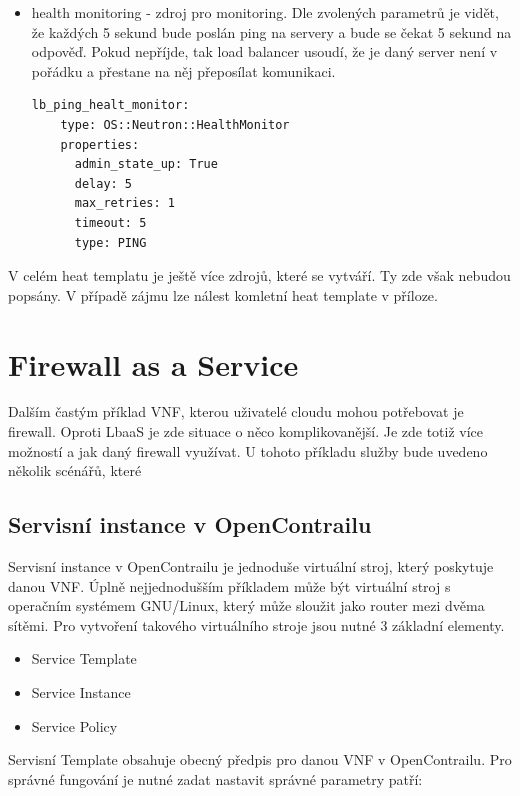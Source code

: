 \begin{itemize}
\item health monitoring - zdroj pro monitoring. Dle zvolených parametrů je vidět, že každých 5 sekund bude poslán ping na servery a bude se čekat 5 sekund na odpověď. Pokud nepříjde, tak load balancer usoudí, že je daný server není v pořádku a přestane na něj přeposílat komunikaci.

\begin{lstlisting}[caption=Monitor]
  lb_ping_healt_monitor:
    type: OS::Neutron::HealthMonitor
    properties:
      admin_state_up: True
      delay: 5
      max_retries: 1
      timeout: 5
      type: PING
\end{lstlisting}
\end{itemize}

V celém heat templatu je ještě více zdrojů, které se vytváří. Ty zde však nebudou popsány. V případě zájmu lze nálest komletní heat template v příloze. 


\section{Firewall as a Service}

Dalším častým příklad VNF, kterou uživatelé cloudu mohou potřebovat je firewall. Oproti LbaaS je zde situace o něco komplikovanější. Je zde totiž více možností a jak daný firewall využívat. U tohoto příkladu služby bude uvedeno několik scénářů, které 

\subsection{Servisní instance v OpenContrailu}

Servisní instance v OpenContrailu je jednoduše virtuální stroj, který poskytuje danou VNF. Úplně nejjednodušším příkladem může být virtuální stroj s operačním systémem GNU/Linux, který může sloužit jako router mezi dvěma sítěmi. Pro vytvoření takového virtuálního stroje jsou nutné 3 základní elementy. 


\begin{itemize}
 	\item Service Template
    \item Service Instance
    \item Service Policy
\end{itemize}

Servisní Template obsahuje obecný předpis pro danou VNF v OpenContrailu. Pro správné fungování je nutné zadat nastavit správné parametry patří:

